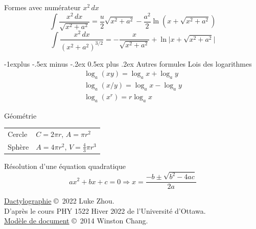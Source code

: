 \documentclass[10pt,landscape]{article}
\makeatletter
\renewcommand{\subsection}{\@startsection{subsection}{2}{0mm}%
                                {-1explus -.5ex minus -.2ex}%
                                {0.5ex plus .2ex}%
                                {\normalfont\normalsize\bfseries}}
\newcommand{\extraline}{\vspace{1em}}
\newcommand{\halfline}{\vspace{0.5em}}
\newcommand{\tableindent}{\hspace{1.5em}}
\makeatother
\begin{document}
\begin{multicols}{3}

Formes avec numérateur $x^2\,dx$
\[ \int \frac{x^2\,dx}{\sqrt{x^2+a^2}} =  \frac{u}{2}\sqrt{x^2+a^2} - \frac{a^2}{2}\ln(x+\sqrt{x^2+a^2}) \]
%
\[ \int \frac{x^2\,dx}{(x^2+a^2)^{3/2}} = -\frac{x}{\sqrt{x^2+a^2}} + \ln \lvert x + \sqrt{x^2+a^2} \rvert \]


\subsection{Autres formules}
Lois des logarithmes
\begin{gather*}
\log_a (xy) = \log_a x + \log_a y \\
 \log_a (x/y) = \log_a x - \log_a y \\
\log_a (x^r) = r\log_a x
\end{gather*}

Géométrie \\
\halfline
\begin{tabular}{@{\tableindent}ll@{}}
	Cercle & $C = 2\pi r $, $A =\pi r^2$ \\
	Sphère & $A = 4\pi r^2$, $V = \frac{4}{3}\pi r^3 $ \\
\end{tabular}
\extraline

Résolution d'une équation quadratique
\[ ax^2 + bx + c = 0 \Longrightarrow x = \frac{-b \pm \sqrt{b^2-4ac} }{2a} \]






\hrulefill


\scriptsize

\href{https://github.com/zhouluke/PhysicsFormulas}{Dactylographie}  \copyright\ 2022 Luke Zhou. \\
D'après le cours PHY 1522 Hiver 2022 de l'Université d'Ottawa. \\
\href{http://wch.github.io/latexsheet/}{Modèle de document}  \copyright\ 2014 Winston Chang.


\end{multicols}
\end{document}
